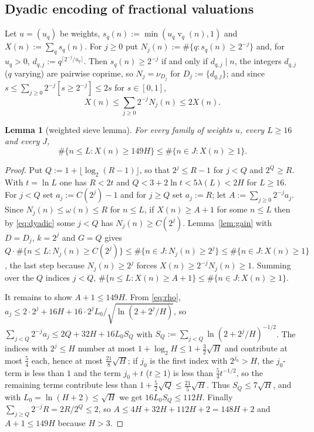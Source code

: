 \documentclass[11pt]{article}
\newtheorem{lemma}[theorem]{Lemma}
\theoremstyle{definition}
\DeclareMathOperator{\vp}{v}
\begin{document}
\subsection*{Dyadic encoding of fractional valuations}
Let $u=(u_q)$ be weights, $s_q(n):=\min(u_q\vp_q(n),1)$ and $X(n):=\sum_qs_q(n)$. For $j\ge0$ put
$N_j(n):=\#\{q:s_q(n)\ge2^{-j}\}$ and, for $u_q>0$, $d_{q,j}:=q^{\lceil2^{-j}/u_q\rceil}$. Then $s_q(n)\ge2^{-j}$ if and only if
$d_{q,j}\mid n$, the integers $d_{q,j}$ ($q$ varying) are pairwise coprime, so $N_j=\nu_{D_j}$ for $D_j:=\{d_{q,j}\}$; and since
$s\le\sum_{j\ge0}2^{-j}[s\ge2^{-j}]\le2s$ for $s\in[0,1]$,
\begin{equation}\label{eq:dyadic}
X(n)\le\sum_{j\ge0}2^{-j}N_j(n)\le2X(n).
\end{equation}

\begin{lemma}[weighted sieve lemma]\label{lem:wsl}
For every family of weights $u$, every $L\ge16$ and every $J$,
\[
\#\{n\le L:X(n)\ge149H\}\le\#\{n\in J:X(n)\ge1\}.
\]
\end{lemma}
\begin{proof}
Put $Q:=1+\lfloor\log_2(R-1)\rfloor$, so that $2^j\le R-1$ for $j<Q$ and $2^Q\ge R$. With $t=\ln L$ one has $R<2t$ and
$Q<3+2\ln t<5\lambda(L)<2H$ for $L\ge16$. For $j<Q$ set $a_j:=C(2^j)-1$ and for $j\ge Q$ set $a_j:=R$; let
$A:=\sum_{j\ge0}2^{-j}a_j$. Since $N_j(n)\le\omega(n)\le R$ for $n\le L$, if $X(n)\ge A+1$ for some $n\le L$ then by
\eqref{eq:dyadic} some $j<Q$ has $N_j(n)\ge C(2^j)$. Lemma~\ref{lem:gain} with $D=D_j$, $k=2^j$ and $G=Q$ gives
$Q\cdot\#\{n\le L:N_j(n)\ge C(2^j)\}\le\#\{n\in J:N_j(n)\ge2^j\}\le\#\{n\in J:X(n)\ge1\}$, the last step because
$N_j(n)\ge2^j$ forces $X(n)\ge2^{-j}N_j(n)\ge1$. Summing over the $Q$ indices $j<Q$,
$\#\{n\le L:X(n)\ge A+1\}\le\#\{n\in J:X(n)\ge1\}$.

It remains to show $A+1\le149H$. From \eqref{eq:rho}, $a_j\le2\cdot2^j+16H+16\cdot2^jL_0/\sqrt{\ln(2+2^j/H)}$, so
$\sum_{j<Q}2^{-j}a_j\le2Q+32H+16L_0S_Q$ with $S_Q:=\sum_{j<Q}\ln(2+2^j/H)^{-1/2}$. The indices with $2^j\le H$ number at most
$1+\log_2H\le1+\tfrac32\sqrt H$ and contribute at most $\tfrac54$ each, hence at most $\tfrac{21}8\sqrt H$; if $j_0$ is the first
index with $2^{j_0}>H$, the $j_0$-term is less than $1$ and the term $j_0+t$ ($t\ge1$) is less than $\tfrac54t^{-1/2}$, so the
remaining terms contribute less than $1+\tfrac52\sqrt Q\le\tfrac{21}5\sqrt H$. Thus $S_Q\le7\sqrt H$, and with
$L_0=\ln(H+2)\le\sqrt H$ we get $16L_0S_Q\le112H$. Finally $\sum_{j\ge Q}2^{-j}R=2R/2^Q\le2$, so
$A\le4H+32H+112H+2=148H+2$ and $A+1\le149H$ because $H>3$.
\end{proof}
\end{document}
